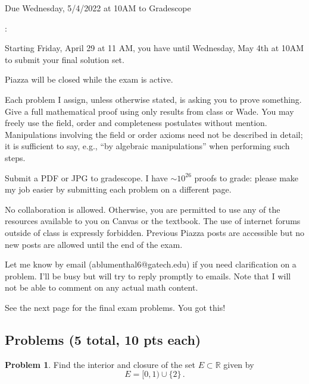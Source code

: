 \documentclass[11pt]{article}
\theoremstyle{definition}
\newtheorem{problem}{Problem}
\begin{document}
  \hfill Due Wednesday, 5/4/2022 at 10AM to Gradescope

\bigskip

: 
\begin{itemize}

{ \item Starting Friday, April 29 at 11 AM, you have until Wednesday, May 4th at 10AM to submit your final solution set. 
 }\item Piazza will be closed while the exam is active. 
\item Each problem I assign, unless otherwise stated, is asking you to prove something. Give a full mathematical proof using only results from class or Wade. You may freely use the field, order and completeness postulates without mention. Manipulations involving the field or order axioms need not be described in detail; it is sufficient to say, e.g.,  ``by algebraic manipulations'' when performing such steps. 
\item Submit a PDF or JPG to gradescope. I have $\sim 10^{26}$ proofs to grade:  please make my job easier by submitting each problem on a different page. 
\item No collaboration is allowed. Otherwise, you are permitted to use any of the resources available to you on Canvas or the textbook. The use of internet forums outside of class is expressly forbidden. Previous Piazza posts are accessible but no new posts are allowed until the end of the exam. 
\item Let me know by email (ablumenthal6@gatech.edu) if you need clarification on a problem. I'll be busy but will try to reply promptly to emails. Note that I will not be able to comment on any actual math content. 
\end{itemize}

See the next page for the final exam problems. You got this!

\newpage

\subsection*{Problems (5 total, 10 pts each)}


\begin{problem}
Find the interior and closure of the set $E \subset \mathbb R$ given by
\[
E = [0,1) \cup \{ 2 \} \, . 
\]
\end{problem}
\end{document}
